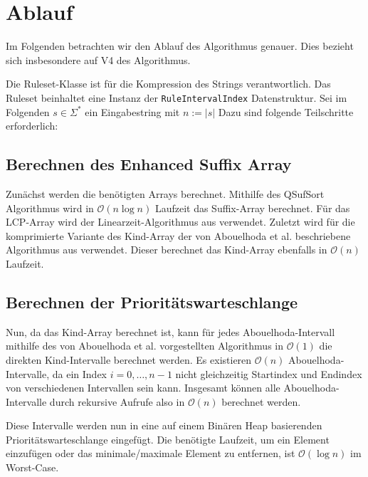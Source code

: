 \section{Ablauf}

Im Folgenden betrachten wir den Ablauf des Algorithmus genauer. Dies bezieht sich insbesondere auf V4 des Algorithmus.

Die Ruleset-Klasse ist für die Kompression des Strings verantwortlich. Das Ruleset beinhaltet eine Instanz der \texttt{RuleIntervalIndex} Datenstruktur. Sei im Folgenden $s \in \Sigma^*$ ein Eingabestring mit $n := |s|$ Dazu sind folgende Teilschritte erforderlich:

\subsection{Berechnen des Enhanced Suffix Array}

Zunächst werden die benötigten Arrays berechnet. Mithilfe des QSufSort Algorithmus \cite{larsson_faster_2007} wird in $\mathcal{O}(n \log n)$ Laufzeit das Suffix-Array berechnet. Für das LCP-Array wird der Linearzeit-Algorithmus aus \cite{kasai_linear-time_2001} verwendet. Zuletzt wird für die komprimierte Variante des Kind-Array der von Abouelhoda et al. beschriebene Algorithmus aus \cite{abouelhoda_optimal_2002} verwendet. Dieser berechnet das Kind-Array ebenfalls in $\mathcal{O}(n)$ Laufzeit.

\subsection{Berechnen der Prioritätswarteschlange}
\label{calcqueue}

Nun, da das Kind-Array berechnet ist, kann für jedes Abouelhoda-Intervall mithilfe des von Abouelhoda et al. vorgestellten Algorithmus in $\mathcal{O}(1)$ die direkten Kind-Intervalle berechnet werden. Es existieren $\mathcal{O}(n)$ Abouelhoda-Intervalle, da ein Index $i = 0,\dots,n - 1$ nicht gleichzeitig Startindex und Endindex von verschiedenen Intervallen sein kann. Insgesamt können alle Abouelhoda-Intervalle durch rekursive Aufrufe also in $\mathcal{O}(n)$ berechnet werden.

Diese Intervalle werden nun in eine auf einem Binären Heap \cite{williams_algorithm_1964} basierenden Prioritätswarteschlange eingefügt. Die benötigte Laufzeit, um ein Element einzufügen oder das minimale/maximale Element zu entfernen, ist $\mathcal{O}(\log n)$ im Worst-Case. 

